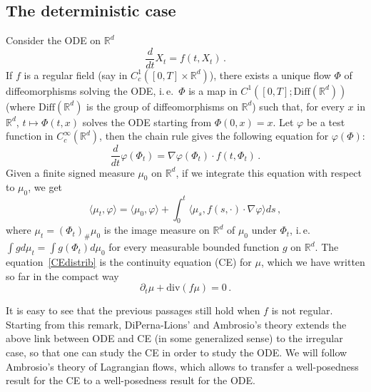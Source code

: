 \documentclass[a4paper,10pt]{article}
\newcommand{\mr}{\mathbb{R}}
\newcommand{\lan}{\langle}
\newcommand{\ran}{\rangle}
\newcommand{\diverg}{\mathrm{div}}
\begin{document}
\subsection{The deterministic case}\label{deterministic case subsection}

Consider the ODE on $\mr^d$
\begin{equation}
\frac{d}{dt}X_t=f(t,X_t) \, .\label{ODEf}
\end{equation}
If $f$ is a regular field (say in $C^1_c([0,T]\times\mr^d)$), there exists a unique flow $\Phi$ of diffeomorphisms solving the ODE, i.\,e.\ $\Phi$ is a map in $C^1([0,T];\mathrm{Diff}(\mr^d))$ (where $\mathrm{Diff}(\mr^d)$ is the group of diffeomorphisms on $\mr^d$) such that, for every $x$ in $\mr^d$, $t\mapsto\Phi(t,x)$ solves the ODE starting from $\Phi(0,x)=x$. Let $\varphi$ be a test function in $C^\infty_c(\mr^d)$, then the chain rule gives the following equation for $\varphi(\Phi)$:
\begin{equation*}
\frac{d}{dt}\varphi(\Phi_t)=\nabla\varphi(\Phi_t)\cdot f(t,\Phi_t) \,.
\end{equation*}
Given a finite signed measure $\mu_0$ on $\mr^d$, if we integrate this equation with respect to $\mu_0$, we get
\begin{equation}\label{CEdistrib}
\lan\mu_t,\varphi\ran=\lan\mu_0,\varphi\ran+\int^t_0\lan\mu_s,f(s,\cdot)\cdot\nabla\varphi\ran ds \, ,
\end{equation}
where $\mu_t=(\Phi_t)_\#\mu_0$ is the image measure on $\mr^d$ of $\mu_0$ under $\Phi_t$, i.\,e.\ $\int gd\mu_t=\int g(\Phi_t)d\mu_0$ for every measurable bounded function $g$ on $\mr^d$. The equation~\eqref{CEdistrib} is the continuity equation (CE) for $\mu$, which we have written so far in the compact way
\begin{equation}\label{CE}\tag{CE}
\partial_t\mu+\diverg(f\mu)=0 \,.
\end{equation}

It is easy to see that the previous passages still hold when $f$ is not regular. Starting from this remark, DiPerna-Lions' and Ambrosio's theory extends the above link between ODE and CE (in some generalized sense) to the irregular case, so that one can study the CE in order to study the ODE. We will follow Ambrosio's theory of Lagrangian flows, which allows to transfer a well-posedness result for the CE to a well-posedness result for the ODE.
\end{document}
